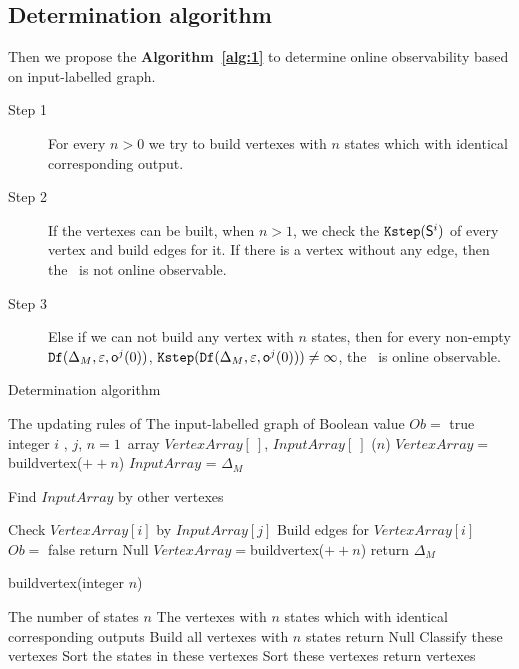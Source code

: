  \subsection{Determination algorithm}
 Then we propose the {\bf Algorithm~\ref{alg:1}} to determine online observability based on input-labelled graph.%

\begin{description}
\item[Step 1]  For every $n>0$ we try to build vertexes with $n$ states which with identical corresponding output. 
\item[Step 2] If the vertexes can  be built, when $n>1$, we check the ${\tt Kstep}(\mathsf{S}^i)$ of every vertex and build edges for it. If there is a vertex without any edge, then the \BCN\ is not online observable.
\item[Step 3] Else if we can not build any vertex with $n$ states, then  for every non-empty ${\tt Df}(\Delta_M,\varepsilon, \mathsf{o}^{j}(0))$, ${\tt Kstep}({\tt Df}(\Delta_M,\varepsilon, \mathsf{o}^{j}(0)))\ne\infty$, the \BCN\ is online observable.
 \end{description}

\begin{algorithm}[h]
\caption{Determination algorithm}
\begin{algorithmic}[1]
\REQUIRE 
The updating rules of \BCN
\ENSURE  
The input-labelled graph of \BCN
\STATE Boolean value $Ob=$ true 
\STATE integer $i$ , $j$, $n=1$\
\STATE array $VertexArray[\ ]$, $InputArray[\ ]$
($n$)
\STATE $VertexArray=${\sf buildvertex}($++n$)
\STATE $InputArray$ = $\Delta_M$ 
\ELSE

\STATE Find $InputArray$ by other vertexes

\ENDIF
{}
\STATE Check $VertexArray[i]$ by $InputArray[j]$ 
\STATE Build edges for $VertexArray[i]$ 
\ENDFOR
{}
\STATE  $Ob=$ false 
\STATE return Null
\ENDIF
\ENDFOR
\STATE $VertexArray=${\sf buildvertex}($++n$)
\ENDWHILE
\STATE return $\Delta_M$\
\end{algorithmic}
 \label{alg:1}
\end{algorithm}
\begin{algorithm}[h!]
\caption{{\sf buildvertex}(integer $n$)}
\begin{algorithmic}[1]
\REQUIRE 
The number of states $n$
\ENSURE  
The vertexes with $n$ states which with identical corresponding outputs 
\STATE  Build all vertexes with $n$ states 
\IF{(Failed to build)} 
\STATE  return Null
\ELSE 
\STATE  Classify these vertexes
\STATE Sort the states in these vertexes
\STATE Sort these vertexes
\STATE return vertexes
\ENDIF 
\end{algorithmic}
 \label{alg:2}
\end{algorithm}

